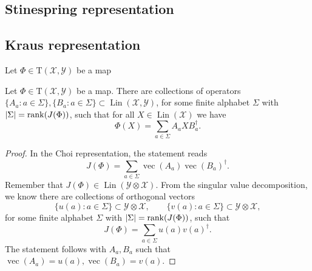 \documentclass[12pt]{report}
\newcommand{\on}[1]{\operatorname{#1}}
\newcommand{\calY}{{\mathcal{Y}}}
\newcommand{\calX}{{\mathcal{X}}}
\newcommand{\rmT}{{\mathrm{T}}}
\DeclareMathOperator{\Lin}{Lin}
\begin{document}
\subsection{Stinespring representation}

\subsection{Kraus representation}

\begin{prop}
	Let $\Phi\in\rmT(\calX,\calY)$ be a map 
\end{prop}

\begin{prop}
	Let $\Phi\in\rmT(\calX,\calY)$ be a map. There are collections of operators $\{A_a: a\in\Sigma\},\{B_a: a\in\Sigma\}\subset\Lin(\calX,\calY)$, for some finite alphabet $\Sigma$ with $\lvert\Sigma\rvert=\rank(J(\Phi))$, such that for all $X\in\Lin(\calX)$ we have
	\begin{equation}
		\Phi(X) = \sum_{a\in\Sigma} A_a X B_a^\dagger.
	\end{equation}
\end{prop}
\begin{proof}
	In the Choi representation, the statement reads
	\begin{equation}
		J(\Phi) = \sum_{a\in\Sigma} \on{vec}(A_a) \on{vec}(B_a)^\dagger.
	\end{equation}
	Remember that $J(\Phi)\in\Lin(\calY\otimes\calX)$.
	From the singular value decomposition, we know there are collections of orthogonal vectors
	\begin{equation}
		\{u(a):a\in\Sigma\}\subset \calY\otimes\calX, \qquad
		\{v(a):a\in\Sigma\}\subset \calY\otimes\calX,
	\end{equation}
	for some finite alphabet $\Sigma$ with $\lvert\Sigma\rvert=\rank(J(\Phi))$, such that
	\begin{equation}
		J(\Phi) = \sum_{a\in\Sigma} u(a) v(a)^\dagger.
	\end{equation}
	The statement follows with $A_a,B_a$ such that $\on{vec}(A_a)=u(a), \on{vec}(B_a)=v(a)$.
\end{proof}
\end{document}
